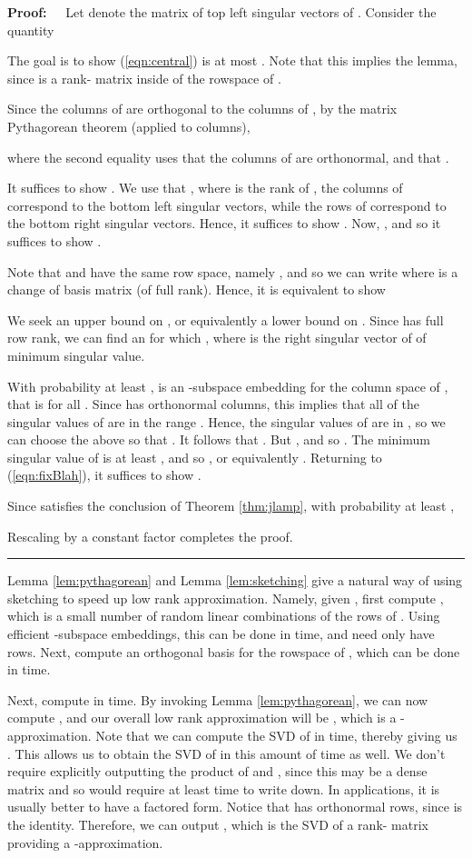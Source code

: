 \documentclass[11pt]{article}
\newenvironment{proof}{\begin{trivlist} \item {\bf Proof:~~}}
  {\qed\end{trivlist}}
\def\qed{\hfill\rule{2mm}{2mm}}
\begin{document}
\begin{proof}
Let  denote the  matrix of top  left singular vectors of . 
Consider the quantity

The goal is to show (\ref{eqn:central}) is at most . Note that this
implies the lemma, since  is a rank- matrix inside of the
rowspace of . 

Since the columns of  are orthogonal to the columns of , by the matrix
Pythagorean theorem (applied to columns),

where the second equality uses that the columns of  are orthonormal, and that . 

It suffices to show 
. We use 
that , where 
 is the rank of , the columns of  correspond to the bottom  left singular vectors, while the rows of 
correspond to the bottom  right singular vectors. Hence, it suffices to show
. Now, , and so it suffices to show
.

Note that  and  have the same row space, namely , 
and so we can
write  where  is a  change of basis matrix (of full rank). Hence, it 
is equivalent to show 


We seek an upper bound on , or equivalently a lower bound on . Since 
 has full row rank, we can find an  for which , where
 is the right singular vector of  of minimum singular value. 

With probability at least ,  is an -subspace embedding for the column space
of , that is  for all . 
Since  has orthonormal columns,
this implies that all of the singular values of  are in the range .
Hence, the singular values of
 are in , so we can choose the  above so that . It follows that
. But ,
and so . 
The minimum singular value of  is at least , and so , or
equivalently . Returning to (\ref{eqn:fixBlah}), it suffices to show
.

Since  satisfies the conclusion of Theorem \ref{thm:jlamp}, with probability at least ,

Rescaling  by a constant factor completes
the proof. 
\end{proof}
Lemma \ref{lem:pythagorean} and Lemma \ref{lem:sketching} give a natural way of using sketching to 
speed up low rank approximation. 
Namely, given , first compute , which is a small number of random linear combinations
of the rows of . Using efficient -subspace embeddings, this can be done in  time,
and  need only have  rows. 
Next, compute an orthogonal basis  for the rowspace of , 
which can be done in 
time. 

Next, compute  in  time. 
By invoking Lemma \ref{lem:pythagorean}, we can now compute , and our
overall low rank approximation will be , which is a -approximation. Note that
we can compute the SVD of  in  time, thereby giving us . This allows us
to obtain the SVD  of  in this amount of time as well. 
We don't require
explicitly outputting the product of  and , since this may be a dense matrix and so would
require at least  time to write down. In applications, it is usually better to have a factored form.
Notice that  has orthonormal rows, since  
is the identity.
Therefore, we can output , which is the SVD of a rank-
matrix providing a -approximation. 
\end{document}
